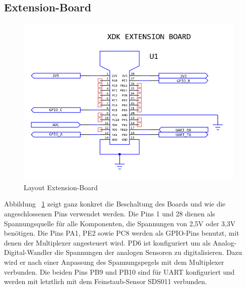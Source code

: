 \subsection{Extension-Board}\label{subsec:Extension-Board}
\begin{figure}[H]
	\includegraphics[width=\textwidth]{images/Layout_XDK.png}	
	\caption{Layout Extension-Board}
	\label{fig:Layout_ExtensionBoard}
\end{figure}
Abbildung ~\ref{fig:Layout_ExtensionBoard} zeigt ganz konkret die Beschaltung des Boards und wie die angeschlossenen Pins verwendet werden. Die Pins 1 und 28 dienen als Spannungsquelle für alle Komponenten, die Spannungen von 2,5V oder 3,3V benötigen. 
\newline
Die Pins PA1, PE2 sowie PC8 werden als \acs{GPIO}-Pins benutzt, mit denen der Multiplexer angesteuert wird.
\newline
PD6 ist konfiguriert um als Analog-Digital-Wandler die Spannungen der analogen Sensoren zu digitalisieren. Dazu wird er nach einer Anpassung des Spannungspegels mit dem Multiplexer verbunden.
\newline
Die beiden Pins PB9 und PB10 sind für \acs{UART} konfiguriert und werden mit letztlich mit dem Feinstaub-Sensor SDS011 verbunden.
